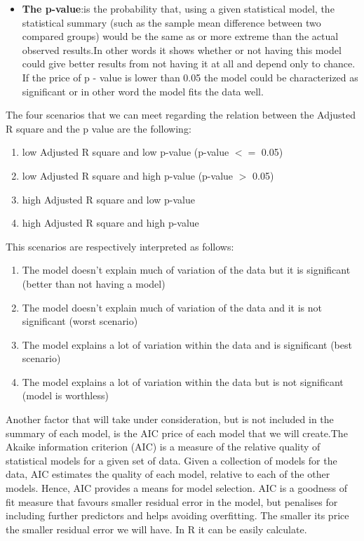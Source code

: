 \documentclass{book}
\begin{document}
\begin{itemize}
\item \textbf{The p-value}:is the probability that, using a given statistical model, the statistical summary (such as the sample mean difference between two compared groups) would be the same as or more extreme than the actual observed results.In other words it shows whether or not having this model could give better results from not having it at all and depend only to chance. If the price of p - value is lower than 0.05 the model could be characterized as significant or in other word the model fits the data well.
\end{itemize}  
The four scenarios that we can meet regarding the relation between the Adjusted R square and the p value are the following:
\begin{enumerate}
\item low Adjusted R square and low p-value (p-value $<=$ 0.05)
\item low Adjusted R square and high p-value (p-value $>$ 0.05)
\item high Adjusted R square and low p-value
\item high Adjusted R square and high p-value
\end{enumerate}
This scenarios are respectively interpreted as follows:
\begin{enumerate}
\item The model doesn't explain much of variation of the data but it is significant (better than not having a model)
\item The model doesn't explain much of variation of the data and it is not significant (worst scenario)
\item The model explains a lot of variation within the data and is significant (best scenario)
\item The model explains a lot of variation within the data but is not significant (model is worthless)
\end{enumerate}
Another factor that will take under consideration, but is not included in the summary of each model, is the AIC price of each model that we will create.The Akaike information criterion (AIC) is a measure of the relative quality of statistical models for a given set of data. Given a collection of models for the data, AIC estimates the quality of each model, relative to each of the other models. Hence, AIC provides a means for model selection. AIC is a goodness of fit measure that favours smaller residual error in the model, but penalises for including further predictors and helps avoiding overfitting. The smaller its price the smaller residual error we will have. In R it can be easily calculate.\\
\end{document}
